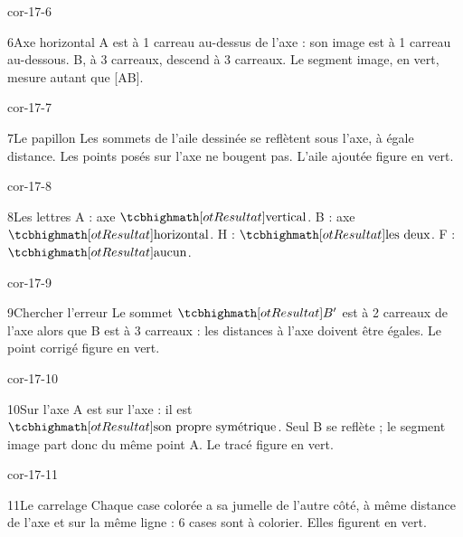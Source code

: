 \begin{blocLivre}{cor-17-6}\begin{corrige}{6}{Axe horizontal}
A est à 1 carreau au-dessus de l’axe : son image est à 1 carreau au-dessous. B, à 3 carreaux, descend à 3 carreaux. Le segment image, en vert, mesure autant que [AB].
\label{fig-cor-17-6}
\end{corrige}\end{blocLivre}
\begin{blocLivre}{cor-17-7}\begin{corrige}{7}{Le papillon}
Les sommets de l’aile dessinée se reflètent sous l’axe, à égale distance. Les points posés sur l’axe ne bougent pas. L’aile ajoutée figure en vert.
\label{fig-cor-17-7}
\end{corrige}\end{blocLivre}
\begin{blocLivre}{cor-17-8}\begin{corrige}{8}{Les lettres}
A : axe $\res{\text{vertical}}$. B : axe $\res{\text{horizontal}}$. H : $\res{\text{les deux}}$. F : $\res{\text{aucun}}$.
\label{fig-cor-17-8}
\end{corrige}\end{blocLivre}
\begin{blocLivre}{cor-17-9}\begin{corrige}{9}{Chercher l’erreur}
Le sommet $\res{B'}$ est à 2 carreaux de l’axe alors que B est à 3 carreaux : les distances à l’axe doivent être égales. Le point corrigé figure en vert.
\label{fig-cor-17-9}
\end{corrige}\end{blocLivre}
\begin{blocLivre}{cor-17-10}\begin{corrige}{10}{Sur l’axe}
A est sur l’axe : il est $\res{\text{son propre symétrique}}$. Seul B se reflète ; le segment image part donc du même point A. Le tracé figure en vert.
\label{fig-cor-17-10}
\end{corrige}\end{blocLivre}
\begin{blocLivre}{cor-17-11}\begin{corrige}{11}{Le carrelage}
Chaque case colorée a sa jumelle de l’autre côté, à même distance de l’axe et sur la même ligne : 6 cases sont à colorier. Elles figurent en vert.
\label{fig-cor-17-11}
\end{corrige}\end{blocLivre}
